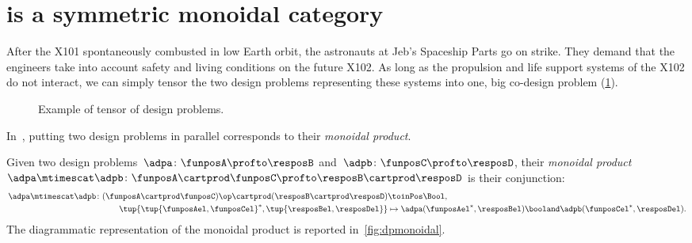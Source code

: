 

\section{\DP is a symmetric monoidal category}\label{sec:parallelism-DP-monoidal}


\begin{example}
    After the X101 spontaneously combusted in low Earth orbit, the astronauts at Jeb's Spaceship Parts go on strike.
    They demand that the engineers take into account safety and living conditions on the future X102.
    As long as the propulsion and life support systems of the X102 do not interact, we can simply tensor the two design problems representing these systems into one, big co-design problem (\cref{fig:examplemonoidal}).
    \begin{figure}[h!]
        \centering
        \caption{Example of tensor of design problems. }
        \label{fig:examplemonoidal}
    \end{figure}
\end{example}
In~\DP, putting two design problems in parallel corresponds to their \emph{monoidal product}.

\begin{definition}
    \label{def:monoidalproduct}
    Given two design problems~$\adpa \colon \funposA \profto \resposB$ and~$\adpb \colon \funposC \profto \resposD$, their \emph{monoidal product}~$\adpa \mtimescat \adpb \colon \funposA \cartprod \funposC \profto \resposB\cartprod \resposD$ is their conjunction:
    \begin{equation}
        \label{eq:monoidalprod_dp}
        \begin{aligned}
            \adpa \mtimescat \adpb \colon (\funposA \cartprod \funposC)\op \cartprod (\resposB \cartprod \resposD) & \toinPos \Bool, \\
            \tup{\tup{\funposAel,\funposCel}^*,\tup{\resposBel,\resposDel}} &\mapsto \adpa(\funposAel^*,\resposBel) \booland \adpb(\funposCel^*,\resposDel).
        \end{aligned}
    \end{equation}
    The diagrammatic representation of the monoidal product is reported in~\cref{fig:dpmonoidal}.
\end{definition}

